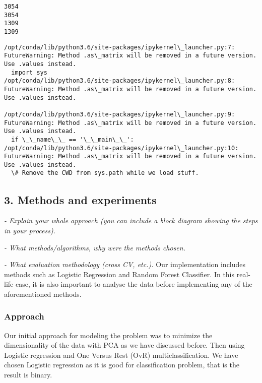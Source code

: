 \documentclass[11pt]{article}
\begin{document}
    \begin{Verbatim}[commandchars=\\\{\}]
3054
3054
1309
1309

    \end{Verbatim}

    \begin{Verbatim}[commandchars=\\\{\}]
/opt/conda/lib/python3.6/site-packages/ipykernel\_launcher.py:7: FutureWarning: Method .as\_matrix will be removed in a future version. Use .values instead.
  import sys
/opt/conda/lib/python3.6/site-packages/ipykernel\_launcher.py:8: FutureWarning: Method .as\_matrix will be removed in a future version. Use .values instead.
  
/opt/conda/lib/python3.6/site-packages/ipykernel\_launcher.py:9: FutureWarning: Method .as\_matrix will be removed in a future version. Use .values instead.
  if \_\_name\_\_ == '\_\_main\_\_':
/opt/conda/lib/python3.6/site-packages/ipykernel\_launcher.py:10: FutureWarning: Method .as\_matrix will be removed in a future version. Use .values instead.
  \# Remove the CWD from sys.path while we load stuff.

    \end{Verbatim}

    \hypertarget{methods-and-experiments}{%
\subsection{3. Methods and experiments}\label{methods-and-experiments}}

    \emph{- Explain your whole approach (you can include a block diagram
showing the steps in your process).}

\emph{- What methods/algorithms, why were the methods chosen. }

\emph{- What evaluation methodology (cross CV, etc.).} Our
implementation includes methods such as Logistic Regression and Random
Forest Classifier. In this real-life case, it is also important to
analyse the data before implementing any of the aforementioned methods.

\hypertarget{approach}{%
\subsubsection{Approach}\label{approach}}

Our initial approach for modeling the problem was to minimize the
dimensionality of the data with PCA as we have discussed before. Then
using Logistic regression and One Versus Rest (OvR) multiclassification.
We have chosen Logistic regression as it is good for classification
problem, that is the result is binary.
\end{document}
